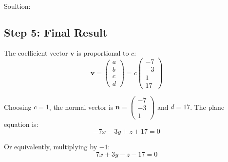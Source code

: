 \documentclass{beamer}
\begin{document}
\begin{frame}{Soultion:}
\subsection*{Step 5: Final Result}
The coefficient vector $\mathbf{v}$ is proportional to $c$:
\[
\mathbf{v} = \begin{pmatrix} a\\ b\\ c\\ d \end{pmatrix} = c \begin{pmatrix} -7\\ -3\\ 1\\ 17 \end{pmatrix}
\]

Choosing $c=1$, the normal vector is $\mathbf{n} = \begin{pmatrix} -7\\ -3\\ 1 \end{pmatrix}$ and $d=17$. The plane equation is:
\[
-7x - 3y + z + 17 = 0 \tag{12}
\]

Or equivalently, multiplying by $-1$:
\[
\boxed{7x + 3y - z - 17 = 0} \tag{13}
\]
\end{frame}
\end{document}

